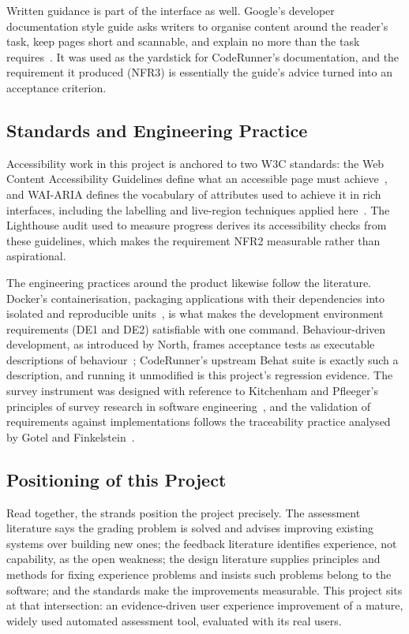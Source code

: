 Written guidance is part of the interface as well. Google's developer documentation style guide asks writers to organise content around the reader's task, keep pages short and scannable, and explain no more than the task requires~\cite{googledevstyle}. It was used as the yardstick for CodeRunner's documentation, and the requirement it produced (NFR3) is essentially the guide's advice turned into an acceptance criterion.

\subsection{Standards and Engineering Practice}

Accessibility work in this project is anchored to two W3C standards: the Web Content Accessibility Guidelines define what an accessible page must achieve~\cite{w3c_wcag22_2023}, and WAI-ARIA defines the vocabulary of attributes used to achieve it in rich interfaces, including the labelling and live-region techniques applied here~\cite{w3c_wai_aria12_2023}. The Lighthouse audit used to measure progress derives its accessibility checks from these guidelines, which makes the requirement NFR2 measurable rather than aspirational.

The engineering practices around the product likewise follow the literature. Docker's containerisation, packaging applications with their dependencies into isolated and reproducible units~\cite{dockerjournal}, is what makes the development environment requirements (DE1 and DE2) satisfiable with one command. Behaviour-driven development, as introduced by North, frames acceptance tests as executable descriptions of behaviour~\cite{northbdd}; CodeRunner's upstream Behat suite is exactly such a description, and running it unmodified is this project's regression evidence. The survey instrument was designed with reference to Kitchenham and Pfleeger's principles of survey research in software engineering~\cite{designingsurvey}, and the validation of requirements against implementations follows the traceability practice analysed by Gotel and Finkelstein~\cite{goteltraceability}.

\subsection{Positioning of this Project}

Read together, the strands position the project precisely. The assessment literature says the grading problem is solved and advises improving existing systems over building new ones; the feedback literature identifies experience, not capability, as the open weakness; the design literature supplies principles and methods for fixing experience problems and insists such problems belong to the software; and the standards make the improvements measurable. This project sits at that intersection: an evidence-driven user experience improvement of a mature, widely used automated assessment tool, evaluated with its real users.
